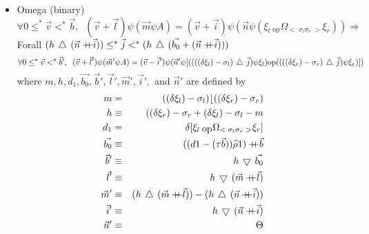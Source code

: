 \begin{itemize}
\item{Omega (binary)}
$$\forall 0\leq^{*}\vec{v}<^{*}\vec{b}, \;\;(\vec{v}+\vec{l})\psi(\vec{m}\psi 
	A)=(\vec{v}+\vec{i})\psi(\vec{n}\psi
	(\xi_{l}\: _{\mbox{op}}\Omega_{<\;\sigma_{l} \sigma_{r}\;>}
	\xi_{r}))\Rightarrow$$
Forall $(h\take(\vec{n}\cat\vec{i}))\leq^{*}\vec{j}<^{*}
	(h\take(\vec{b_{0}}+(\vec{n}\cat\vec{i})))$
$$\forall 0\leq^{*}\vec{v}<^{*}\vec{b}', \;\;(\vec{v}+\vec{l}')\psi(\vec{m}'
	\psi A)=(\vec{v}-\vec{i}')\psi(\vec{n}'\psi 
	[((((\delta\xi_{l})-\sigma_{l})\,\bigtriangleup\,\vec{j})\psi\xi_{l}) \mbox{op}
	((((\delta\xi_{r})-\sigma_{r})\,\bigtriangleup\,\vec{j})\psi\xi_{r})]) $$
where $m, h, d_{1}, \vec{b_{0}}, \vec{b}', \vec{l}', \vec{m}', \vec{i}',$ and 
	$\vec{n}'$ are defined by
\begin{eqnarray*}
m & = & ((\delta\xi_{l})-\sigma_{l})\lfloor ((\delta\xi_{r})-\sigma_{r}) \\
h & \equiv & ((\delta\xi_{r})-\sigma_{r}+(\delta\xi_{l})-\sigma_{l}-m \\
d_{1} & = & \delta [\xi_{l}\: _{\mbox{op}}\Omega _{<\;\sigma_{l} \sigma_{r}\;>}
	\xi_{r}] \\
\vec{b_{0}} & \equiv & ((d1-(\tau\vec{b}))\rshp 1)\cat\vec{b} \\
\vec{b}' & \equiv & h\drop\vec{b_{0}} \\
\vec{l}' & \equiv & h\drop(\vec{m}\cat\vec{l}) \\
\vec{m}' & \equiv & (h\take(\vec{m}\cat\vec{l}))-(h\take(\vec{n}\cat\vec{i})) \\
\vec{i}' & \equiv & h\drop(\vec{n}\cat\vec{i}) \\
\vec{n}' & \equiv & \Theta \\
\end{eqnarray*}
\end{itemize}
 
